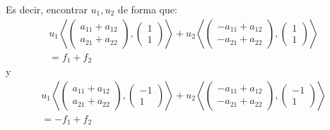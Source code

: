 \documentclass[10pt,handout]{beamer}
\theoremstyle{plain} %
\theoremstyle{plain} %
\theoremstyle{plain} %
\theoremstyle{plain} %
\theoremstyle{definition}
\theoremstyle{example}
\theoremstyle{example}
\theoremstyle{remark}
\theoremstyle{remark}
\begin{document}
\begin{frame}
Es decir, encontrar $u_1,u_2$ de forma que:
\begin{align*}
u_1 \left\langle  \left(
\begin{array}{c}
a_{11}+a_{12} \\ 
a_{21}+a_{22}
\end{array}
\right), \left(
\begin{array}{c}
1 \\ 
1
\end{array}
\right) \right\rangle  + u_2 \left\langle  \left(
\begin{array}{c}
-a_{11}+a_{12} \\ 
-a_{21}+a_{22}
\end{array}
\right), \left(
\begin{array}{c}
1 \\ 
1
\end{array}
\right) \right\rangle  \\ = f_1+f_2
\end{align*}
y
\begin{align*}
u_1 \left\langle  \left(
\begin{array}{c}
a_{11}+a_{12} \\ 
a_{21}+a_{22}
\end{array}
\right), \left(
\begin{array}{r}
-1 \\ 
1
\end{array}
\right) \right\rangle  + u_2 \left\langle  \left(
\begin{array}{c}
-a_{11}+a_{12} \\ 
-a_{21}+a_{22}
\end{array}
\right), \left(
\begin{array}{r}
-1 \\ 
1
\end{array}
\right) \right\rangle  \\ = -f_1+f_2
\end{align*}
\end{frame}
\end{document}
